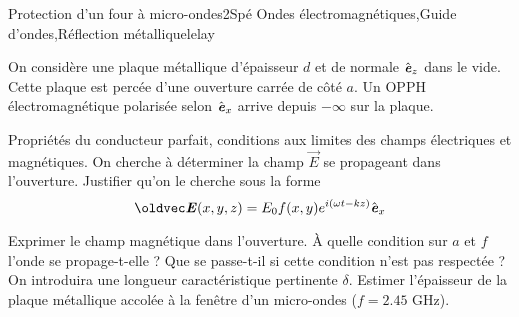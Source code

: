 \begin{exercise}{Protection d'un four à micro-ondes}{2}{Spé}
{Ondes électromagnétiques,Guide d'ondes,Réflection métallique}{lelay}

On considère une plaque métallique d'épaisseur $d$ et de normale $\hat{\bm{\mathit{e}}}_z$ dans le vide. Cette plaque est percée d'une ouverture carrée de côté $a$. Un OPPH électromagnétique polarisée selon $\hat{\bm{\mathit{e}}}_x$ arrive depuis $-\infty$ sur la plaque.
\begin{questions}
    \questioncours Propriétés du conducteur parfait, conditions aux limites des champs électriques et magnétiques.
    \question On cherche à déterminer la champ $\vec{E}$ se propageant dans l'ouverture. Justifier qu'on le cherche sous la forme
    $$
    \vec{E}(x, y, z) = E_0 f(x,y) e^{i(\omega t - k z)} \ve_x
    $$
    \question Exprimer le champ magnétique dans l'ouverture.
    \question À quelle condition sur $a$ et $f$ l'onde se propage-t-elle ?
    \question Que se passe-t-il si cette condition n'est pas respectée ? On introduira une longueur caractéristique pertinente $\delta$.
    \question Estimer l'épaisseur de la plaque métallique accolée à la fenêtre d'un micro-ondes ($f = 2.45$ GHz).
\end{questions}

\end{exercise}

